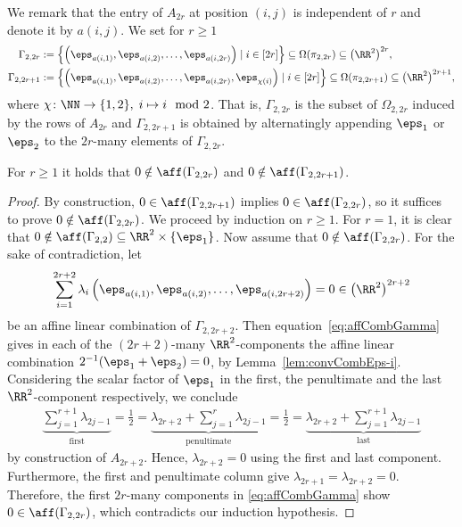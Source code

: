 We remark that the entry of $A_{2r}$ at position $(i,j)$ is independent of $r$ and denote it by $a(i,j)$. We set for $r \geq 1$
	\begin{align*}
	\Gamma_{2,2r} &:= \left\lbrace \left( \eps_{a(i,1)}, \eps_{a(i,2)}, \ldots, \eps_{a(i,2r)} \right) \mid i \in [2r] \right\rbrace \subseteq \Omega(\pi_{2,2r}) \subseteq \big( \RR^2 \big)^{2r},\\
	\Gamma_{2,2r+1} &:= \left\lbrace \left( \eps_{a(i,1)}, \eps_{a(i,2)}, \ldots, \eps_{a(i,2r)}, \eps_{\chi(i)} \right) \mid i \in [2r] \right\rbrace \subseteq \Omega(\pi_{2,2r+1}) \subseteq \big( \RR^2 \big)^{2r+1},
	\end{align*}
where $\chi \colon \NN \to \{1,2\}, \; i \mapsto i \mod 2$. That is, $\Gamma_{2,2r}$ is the subset of $\Omega_{2,2r}$ induced by the rows of $A_{2r}$ and $\Gamma_{2,2r+1}$ is obtained by alternatingly appending $\eps_1$ or $\eps_2$ to the $2r$-many elements of $\Gamma_{2,2r}$.
	
\begin{lem}\label{lem:affHullQubits}
For $r \geq 1$ it holds that $0 \notin \aff(\Gamma_{2,2r})$ and $0 \notin \aff(\Gamma_{2,2r+1})$.
\end{lem}

\begin{proof}
By construction, $0 \in \aff(\Gamma_{2,2r+1})$ implies $0 \in \aff(\Gamma_{2,2r})$, so it suffices to prove $0 \notin \aff(\Gamma_{2,2r})$. We proceed by induction on $r \geq 1$. For $r=1$, it is clear that $0 \notin \aff(\Gamma_{2,2}) \subseteq \RR^2 \times \lbrace \eps_1 \rbrace$.
Now assume that $0 \notin \aff(\Gamma_{2,2r})$. For the sake of contradiction, let
	\begin{equation}\label{eq:affCombGamma}
	\sum_{i=1}^{2r+2} \lambda_i \left( \eps_{a(i,1)}, \eps_{a(i,2)}, \ldots, \eps_{a(i,2r+2)} \right) = 0 \in \left( \RR^2 \right)^{2r+2}
	\end{equation}
be an affine linear combination of $\Gamma_{2,2r+2}$. Then equation~\eqref{eq:affCombGamma} gives in each of the $(2r+2)$-many $\RR^2$-components the affine linear combination $2^{-1} (\eps_1 + \eps_2) = 0$, by Lemma~\ref{lem:convCombEps-i}. Considering the scalar factor of $\eps_1$ in the first, the penultimate and the last $\RR^{2}$-component respectively, we conclude
	\begin{align*}
	\underbrace{ \sum_{j=1}^{r+1} \lambda_{2j-1} }_{\text{first}} = \frac{1}{2}
	= \underbrace{ \lambda_{2r+2} + \sum_{j=1}^{r} \lambda_{2j-1} }_{\text{penultimate}} 
	= \frac{1}{2} = \underbrace { \lambda_{2r+2} + \sum_{j=1}^{r+1} \lambda_{2j-1} }_{\text{last}}
	\end{align*}
by construction of $A_{2r+2}$. Hence, $\lambda_{2r+2} = 0$ using the first and last component. Furthermore, the first and penultimate column give $\lambda_{2r+1} = \lambda_{2r+2} = 0$. Therefore, the first $2r$-many components in \cref{eq:affCombGamma} show $0 \in \aff(\Gamma_{2,2r})$, which contradicts our induction hypothesis.
\end{proof}

